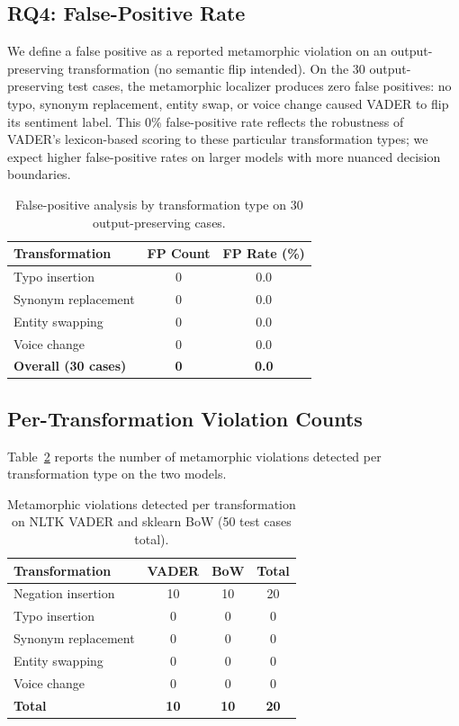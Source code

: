 \documentclass[sigconf,nonacm]{acmart}
\begin{document}
\subsection{RQ4: False-Positive Rate}

We define a false positive as a reported metamorphic violation on an output-preserving transformation (no semantic flip intended).
On the 30 output-preserving test cases, the metamorphic localizer produces zero false positives: no typo, synonym replacement, entity swap, or voice change caused VADER to flip its sentiment label.
This 0\% false-positive rate reflects the robustness of VADER's lexicon-based scoring to these particular transformation types; we expect higher false-positive rates on larger models with more nuanced decision boundaries.

\begin{table}[t]
\centering
\caption{False-positive analysis by transformation type on 30 output-preserving cases.}
\label{tab:fp}
\begin{tabular}{@{}lcc@{}}
\toprule
\textbf{Transformation} & \textbf{FP Count} & \textbf{FP Rate (\%)} \\
\midrule
Typo insertion        & 0 & 0.0 \\
Synonym replacement   & 0 & 0.0 \\
Entity swapping       & 0 & 0.0 \\
Voice change          & 0 & 0.0 \\
\midrule
\textbf{Overall (30 cases)} & \textbf{0} & \textbf{0.0} \\
\bottomrule
\end{tabular}
\end{table}

\subsection{Per-Transformation Violation Counts}

Table~\ref{tab:bugs} reports the number of metamorphic violations detected per transformation type on the two models.

\begin{table}[t]
\centering
\caption{Metamorphic violations detected per transformation on NLTK VADER and sklearn BoW (50 test cases total).}
\label{tab:bugs}
\begin{tabular}{@{}lccc@{}}
\toprule
\textbf{Transformation} & \textbf{VADER} & \textbf{BoW} & \textbf{Total} \\
\midrule
Negation insertion      & 10 & 10 & 20 \\
Typo insertion          & 0 & 0 & 0 \\
Synonym replacement     & 0 & 0 & 0 \\
Entity swapping         & 0 & 0 & 0 \\
Voice change            & 0 & 0 & 0 \\
\midrule
\textbf{Total}          & \textbf{10} & \textbf{10} & \textbf{20} \\
\bottomrule
\end{tabular}
\end{table}
\end{document}
